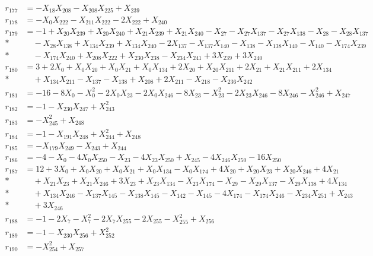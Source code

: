 \begin{align*}
r_{177} &= -X_{18}X_{208} - X_{208}X_{225} + X_{239} \\[3pt]
r_{178} &= -X_{0}X_{222} - X_{211}X_{222} - 2X_{222} + X_{240} \\[3pt]
r_{179} &= -1 + X_{20}X_{239} + X_{20}X_{240} + X_{21}X_{239} + X_{21}X_{240} - X_{27} - X_{27}X_{137} - X_{27}X_{138} - X_{28} - X_{28}X_{137} \\*
&\quad  - X_{28}X_{138} + X_{134}X_{239} + X_{134}X_{240} - 2X_{137} - X_{137}X_{140} - X_{138} - X_{138}X_{140} - X_{140} - X_{174}X_{239} \\*
&\quad  - X_{174}X_{240} + X_{208}X_{222} + X_{230}X_{238} - X_{234}X_{241} + 3X_{239} + 3X_{240} \\[3pt]
r_{180} &= 3 + 2X_{0} + X_{0}X_{20} + X_{0}X_{21} + X_{0}X_{134} + 2X_{20} + X_{20}X_{211} + 2X_{21} + X_{21}X_{211} + 2X_{134} \\*
&\quad  + X_{134}X_{211} - X_{137} - X_{138} + X_{208} + 2X_{211} - X_{218} - X_{236}X_{242} \\[3pt]
r_{181} &= -16 - 8X_{0} - X_{0}^{2} - 2X_{0}X_{23} - 2X_{0}X_{246} - 8X_{23} - X_{23}^{2} - 2X_{23}X_{246} - 8X_{246} - X_{246}^{2} + X_{247} \\[3pt]
r_{182} &= -1 - X_{230}X_{247} + X_{243}^{2} \\[3pt]
r_{183} &= -X_{245}^{2} + X_{248} \\[3pt]
r_{184} &= -1 - X_{191}X_{248} + X_{244}^{2} + X_{248} \\[3pt]
r_{185} &= -X_{179}X_{249} - X_{243} + X_{244} \\[3pt]
r_{186} &= -4 - X_{0} - 4X_{0}X_{250} - X_{23} - 4X_{23}X_{250} + X_{245} - 4X_{246}X_{250} - 16X_{250} \\[3pt]
r_{187} &= 12 + 3X_{0} + X_{0}X_{20} + X_{0}X_{21} + X_{0}X_{134} - X_{0}X_{174} + 4X_{20} + X_{20}X_{23} + X_{20}X_{246} + 4X_{21} \\*
&\quad  + X_{21}X_{23} + X_{21}X_{246} + 3X_{23} + X_{23}X_{134} - X_{23}X_{174} - X_{29} - X_{29}X_{137} - X_{29}X_{138} + 4X_{134} \\*
&\quad  + X_{134}X_{246} - X_{137}X_{145} - X_{138}X_{145} - X_{142} - X_{145} - 4X_{174} - X_{174}X_{246} - X_{234}X_{251} + X_{243} \\*
&\quad  + 3X_{246} \\[3pt]
r_{188} &= -1 - 2X_{7} - X_{7}^{2} - 2X_{7}X_{255} - 2X_{255} - X_{255}^{2} + X_{256} \\[3pt]
r_{189} &= -1 - X_{230}X_{256} + X_{252}^{2} \\[3pt]
r_{190} &= -X_{254}^{2} + X_{257} \\[3pt]

\end{align*}
